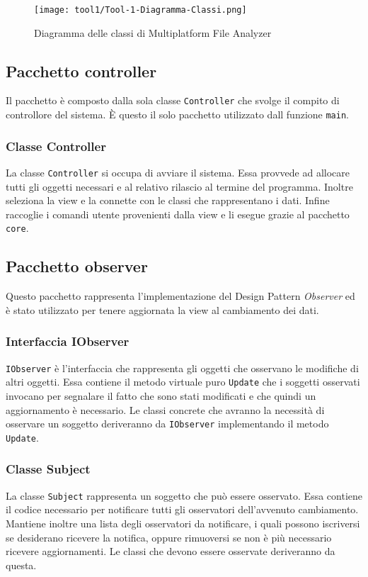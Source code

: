 		\begin{figure}[!h] 
			\centering 
			\texttt{[image: tool1/Tool-1-Diagramma-Classi.png]} 
			\caption{Diagramma delle classi di Multiplatform File Analyzer}
		\end{figure}

\newpage

\subsection{Pacchetto controller}
Il pacchetto è composto dalla sola classe \texttt{Controller} che svolge il compito di controllore del sistema. È questo il solo pacchetto utilizzato dall funzione \texttt{main}.

\subsubsection{Classe Controller}
La classe \texttt{Controller} si occupa di avviare il sistema. Essa provvede ad allocare tutti gli oggetti necessari e al relativo rilascio al termine del programma. Inoltre seleziona la view e la connette con le classi che rappresentano i dati. Infine raccoglie i comandi utente provenienti dalla view e li esegue grazie al pacchetto \texttt{core}.

\subsection{Pacchetto observer}
Questo pacchetto rappresenta l'implementazione del Design Pattern \textit{Observer} ed è stato utilizzato per tenere aggiornata la view al cambiamento dei dati.

\subsubsection{Interfaccia IObserver}
\texttt{IObserver} è l'interfaccia che rappresenta gli oggetti che osservano le modifiche di altri oggetti. Essa contiene il metodo virtuale puro \texttt{Update} che i soggetti osservati invocano per segnalare il fatto che sono stati modificati e che quindi un aggiornamento è necessario. Le classi concrete che avranno la necessità di osservare un soggetto deriveranno da \texttt{IObserver} implementando il metodo \texttt{Update}.

\subsubsection{Classe Subject}
La classe \texttt{Subject} rappresenta un soggetto che può essere osservato. Essa contiene il codice necessario per notificare tutti gli osservatori dell'avvenuto cambiamento. Mantiene inoltre una lista degli osservatori da notificare, i quali possono iscriversi se desiderano ricevere la notifica, oppure rimuoversi se non è più necessario ricevere aggiornamenti. Le classi che devono essere osservate deriveranno da questa.

